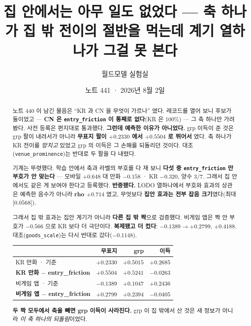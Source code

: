\documentclass[11pt]{article}
\begin{document}
\title{집 안에서는 아무 일도 없었다 --- 축 하나가 집 밖 전이의 절반을 먹는데
계기 열하나가 그걸 못 본다}
\author{월드모델 실험실}
\date{노트 441 · 2026년 8월 2일}
\maketitle

\begin{abstract}
노트 440 이 남긴 물음은 ``KR 과 CN 을 무엇이 가르나'' 였다. 레코드를 열어
보니 후보가 둘이었고 --- \textbf{CN 은 \texttt{entry\_friction} 이 통째로
없다}(KR 은 100\%) --- 그 축 하나만 가려 봤다. 사전 등록은 편지대로
통과했다. \textbf{그런데 예측한 이유가 아니었다.} grp 이득이 준 것은 grp
팔이 내려서가 아니라 \textbf{무표지 팔이 $+0.2330$ 에서 $+0.5504$ 로 뛰어서}
였다. 축 하나가 KR 전이를 \emph{망치고} 있었고 grp 의 이득은 그 손해를
되돌리던 것이다. 대조(\texttt{venue\_prominence})는 반대로 두 팔을 다 내렸다.

기계는 뚜렷했다. 학습 안에서 축과 라벨의 부호를 다 재 보니 \textbf{다섯 중
\texttt{entry\_friction} 만 부호가 안 맞는다} --- 모바일 $+0.648$ 대 만화
$-0.158$ · KR $-0.320$, 양수 3/7. 그래서 집 안에서도 같은 게 보여야 한다고
등록했다. \textbf{반증됐다.} LODO 열하나에서 부호와 효과의 상관은 예측한
음수가 아니라 \textbf{rho $+0.714$} 였고, 무엇보다 \textbf{집안 효과는 전부
잡음 크기}였다(최대 $|0.0568|$).

그래서 집 밖 효과는 집안 계기가 아니라 \textbf{다른 집 밖 짝}으로
검증했다. 비게임 앱은 짝 안 부호가 $-0.566$ 으로 KR 보다 더 극단이다.
\textbf{복제됐고 더 컸다}: $-0.1389 \to +0.2799$, \textbf{$+0.4188$}.
대조(\texttt{goods\_scale})는 다시 반대로 갔다($-0.1148$).

\begin{center}
\begin{tabular}{lrrr}
\hline
 & 무표지 & grp & 이득 \\
\hline
KR 만화 · 기준 & $+0.2330$ & $+0.5015$ & $+0.2685$ \\
\textbf{KR 만화 $-$ entry\_friction} & $\mathbf{+0.5504}$ & $+0.5241$ & $-0.0263$ \\
비게임 앱 · 기준 & $-0.1389$ & $+0.1047$ & $+0.2436$ \\
\textbf{비게임 앱 $-$ entry\_friction} & $\mathbf{+0.2799}$ & $+0.2394$ & $-0.0405$ \\
\hline
\end{tabular}
\end{center}

\textbf{두 짝 모두에서 축을 빼면 grp 이득이 사라진다.} grp 이 집 밖에서
산 것은 새 정보가 아니라 \emph{이 축 하나의 되돌림}이었다.
\end{abstract}
\end{document}
